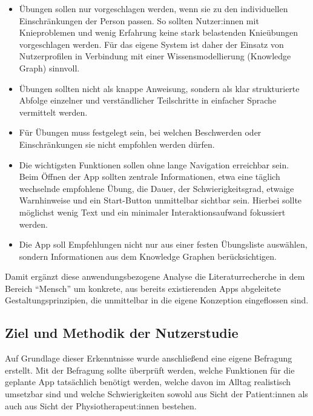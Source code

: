 \begin{itemize}
    \item Übungen sollen nur vorgeschlagen werden, wenn sie zu den individuellen Einschränkungen der Person passen. So sollten Nutzer:innen mit Knieproblemen und wenig Erfahrung keine stark belastenden Knieübungen vorgeschlagen werden. Für das eigene System ist daher der Einsatz von Nutzerprofilen in Verbindung mit einer Wissensmodellierung (Knowledge Graph) sinnvoll.

    \item Übungen sollten nicht als knappe Anweisung, sondern als klar strukturierte Abfolge einzelner und verständlicher Teilschritte in einfacher Sprache vermittelt werden.

    \item Für Übungen muss festgelegt sein, bei welchen Beschwerden oder Einschränkungen sie nicht empfohlen werden dürfen.

    \item Die wichtigsten Funktionen sollen ohne lange Navigation erreichbar sein. Beim Öffnen der App sollten zentrale Informationen, etwa eine täglich wechselnde empfohlene Übung, die Dauer, der Schwierigkeitsgrad, etwaige Warnhinweise und ein Start-Button unmittelbar sichtbar sein. Hierbei sollte möglichst wenig Text und ein minimaler Interaktionsaufwand fokussiert werden.

    \item Die App soll Empfehlungen nicht nur aus einer festen Übungsliste auswählen, sondern Informationen aus dem Knowledge Graphen berücksichtigen.
\end{itemize}

Damit ergänzt diese anwendungsbezogene Analyse die Literaturrecherche in dem Bereich ``Mensch'' um konkrete, aus bereits existierenden Apps abgeleitete Gestaltungsprinzipien, die unmittelbar in die eigene Konzeption eingeflossen sind.

\subsection{Ziel und Methodik der Nutzerstudie}

Auf Grundlage dieser Erkenntnisse wurde anschließend eine eigene Befragung erstellt. Mit der Befragung sollte überprüft werden, welche Funktionen für die geplante App tatsächlich benötigt werden, welche davon im Alltag realistisch umsetzbar sind und welche Schwierigkeiten sowohl aus Sicht der Patient:innen als auch aus Sicht der Physiotherapeut:innen bestehen.

